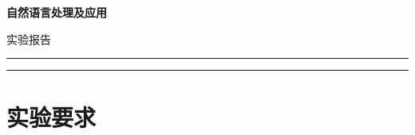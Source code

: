\documentclass[a4paper,oneside,12pt]{ctexart}
\theoremstyle{plain}
\theoremstyle{nonumberplain}
\begin{document}
    \begin{titlepage}
        \thispagestyle{fancy}
        \fancyfoot[C]{}
        \begin{center}
            \bfseries{}
            自然语言处理及应用
            
            实验报告
        \end{center}

        {
            \noindent\color{red}\rule{\textwidth}{3pt}
            \vspace*{1pt}
            \rule{\textwidth}{0.5pt}
        }

    \end{titlepage}
    \pagestyle{fancy}
    \fancyhead[L]{}
    \fancyhead[R]{}
    \section{实验要求}
\end{document}
